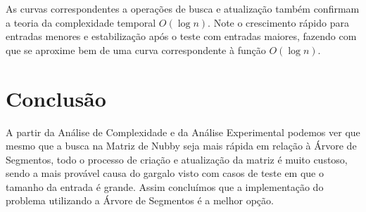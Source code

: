 \documentclass{article}
\begin{document}
As curvas correspondentes a operações de busca e atualização também confirmam a teoria da complexidade temporal $O(\log n)$. Note o crescimento rápido para entradas menores e estabilização após o teste com entradas maiores, fazendo com que se aproxime bem de uma curva correspondente à função $O(\log n)$.

\section{Conclusão}

A partir da Análise de Complexidade e da Análise Experimental podemos ver que mesmo que a busca na Matriz de Nubby seja mais rápida em relação à Árvore de Segmentos, todo o processo de criação e atualização da matriz é muito custoso, sendo a mais provável causa do gargalo visto com casos de teste em que o tamanho da entrada é grande. Assim concluímos que a implementação do problema utilizando a Árvore de Segmentos é a melhor opção.
\end{document}

